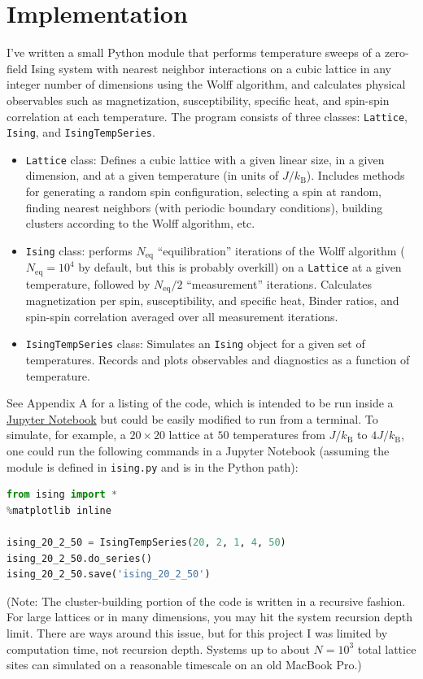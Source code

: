 \documentclass[11pt, oneside]{article}
\newcommand{\kB}{k_\text{B}}
\begin{document}
\section{Implementation}
I've written a small Python module that performs temperature sweeps of a zero-field Ising system with nearest neighbor interactions on a cubic lattice in any integer number of dimensions using the Wolff algorithm, and calculates physical observables such as magnetization, susceptibility, specific heat, and spin-spin correlation at each temperature. The program consists of three classes: \lstinline[language=Python]{Lattice}, \lstinline[language=Python]{Ising}, and \lstinline[language=Python]{IsingTempSeries}.
\begin{itemize}
\item{\lstinline[language=Python]{Lattice} class: Defines a cubic lattice with a given linear size, in a given dimension, and at a given temperature (in units of $J/\kB$). Includes methods for generating a random spin configuration, selecting a spin at random, finding nearest neighbors (with periodic boundary conditions), building clusters according to the Wolff algorithm, etc.}
\item{\lstinline[language=Python]{Ising} class: performs $N_\text{eq}$ ``equilibration'' iterations of the Wolff algorithm ($N_\text{eq}=10^4$ by default, but this is probably overkill) on a \lstinline[language=Python]{Lattice} at a given temperature, followed by $N_\text{eq}/2$ ``measurement'' iterations. Calculates magnetization per spin, susceptibility, and specific heat, Binder ratios, and spin-spin correlation averaged over all measurement iterations.}
\item{\lstinline[language=Python]{IsingTempSeries} class: Simulates an \lstinline[language=Python]{Ising} object for a given set of temperatures. Records and plots observables and diagnostics as a function of temperature.}
\end{itemize}
See Appendix A for a listing of the code, which is intended to be run inside a \href{http://jupyter-notebook-beginner-guide.readthedocs.io/en/latest/what_is_jupyter.html}{Jupyter Notebook} but could be easily modified to run from a terminal. 
To simulate, for example, a $20\times20$ lattice at $50$ temperatures from $J/\kB$ to $4J/\kB$, one could run the following commands in a Jupyter Notebook (assuming the module is defined in \lstinline[language=Python]{ising.py} and is in the Python path):
\begin{lstlisting}[language=Python]
from ising import *
%matplotlib inline

ising_20_2_50 = IsingTempSeries(20, 2, 1, 4, 50)
ising_20_2_50.do_series()
ising_20_2_50.save('ising_20_2_50')
\end{lstlisting}
(Note: The cluster-building portion of the code is written in a recursive fashion. For large lattices or in many dimensions, you may hit the system recursion depth limit. There are ways around this issue, but for this project I was limited by computation time, not recursion depth. Systems up to about $N=10^3$ total lattice sites can simulated on a reasonable timescale on an old MacBook Pro.)
%
%
\end{document}
